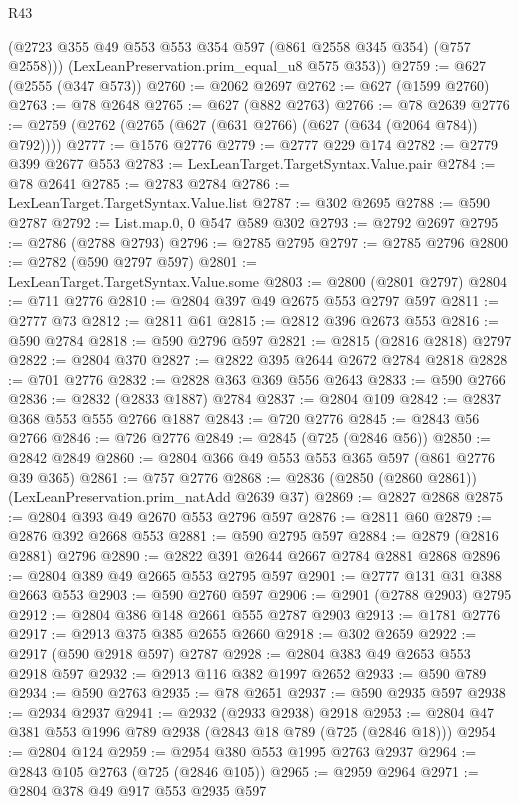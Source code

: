\begin{lexlean}{R43}
\begin{coremodule}
        (@2723 @355 @49 @553 @553 @354 @597 (@861 @2558 @345 @354) (@757 @2558)))
      (LexLeanPreservation.prim_equal_u8 @575 @353))
@2759 := @627 (@2555 (@347 @573))
@2760 := @2062 @2697
@2762 := @627 (@1599 @2760)
@2763 := @78 @2648
@2765 := @627 (@882 @2763)
@2766 := @78 @2639
@2776 := @2759 (@2762 (@2765 (@627 (@631 @2766) (@627 (@634 (@2064 @784)) @792))))
@2777 := @1576 @2776
@2779 := @2777 @229 @174
@2782 := @2779 @399 @2677 @553
@2783 := LexLeanTarget.TargetSyntax.Value.pair
@2784 := @78 @2641
@2785 := @2783 @2784
@2786 := LexLeanTarget.TargetSyntax.Value.list
@2787 := @302 @2695
@2788 := @590 @2787
@2792 := List.map.{0, 0} @547 @589 @302
@2793 := @2792 @2697
@2795 := @2786 (@2788 @2793)
@2796 := @2785 @2795
@2797 := @2785 @2796
@2800 := @2782 (@590 @2797 @597)
@2801 := LexLeanTarget.TargetSyntax.Value.some
@2803 := @2800 (@2801 @2797)
@2804 := @711 @2776
@2810 := @2804 @397 @49 @2675 @553 @2797 @597
@2811 := @2777 @73
@2812 := @2811 @61
@2815 := @2812 @396 @2673 @553
@2816 := @590 @2784
@2818 := @590 @2796 @597
@2821 := @2815 (@2816 @2818) @2797
@2822 := @2804 @370
@2827 := @2822 @395 @2644 @2672 @2784 @2818
@2828 := @701 @2776
@2832 := @2828 @363 @369 @556 @2643
@2833 := @590 @2766
@2836 := @2832 (@2833 @1887) @2784
@2837 := @2804 @109
@2842 := @2837 @368 @553 @555 @2766 @1887
@2843 := @720 @2776
@2845 := @2843 @56 @2766
@2846 := @726 @2776
@2849 := @2845 (@725 (@2846 @56))
@2850 := @2842 @2849
@2860 := @2804 @366 @49 @553 @553 @365 @597 (@861 @2776 @39 @365)
@2861 := @757 @2776
@2868 := @2836 (@2850 (@2860 @2861)) (LexLeanPreservation.prim_natAdd @2639 @37)
@2869 := @2827 @2868
@2875 := @2804 @393 @49 @2670 @553 @2796 @597
@2876 := @2811 @60
@2879 := @2876 @392 @2668 @553
@2881 := @590 @2795 @597
@2884 := @2879 (@2816 @2881) @2796
@2890 := @2822 @391 @2644 @2667 @2784 @2881 @2868
@2896 := @2804 @389 @49 @2665 @553 @2795 @597
@2901 := @2777 @131 @31 @388 @2663 @553
@2903 := @590 @2760 @597
@2906 := @2901 (@2788 @2903) @2795
@2912 := @2804 @386 @148 @2661 @555 @2787 @2903
@2913 := @1781 @2776
@2917 := @2913 @375 @385 @2655 @2660
@2918 := @302 @2659
@2922 := @2917 (@590 @2918 @597) @2787
@2928 := @2804 @383 @49 @2653 @553 @2918 @597
@2932 := @2913 @116 @382 @1997 @2652
@2933 := @590 @789
@2934 := @590 @2763
@2935 := @78 @2651
@2937 := @590 @2935 @597
@2938 := @2934 @2937
@2941 := @2932 (@2933 @2938) @2918
@2953 := @2804 @47 @381 @553 @1996 @789 @2938 (@2843 @18 @789 (@725 (@2846 @18)))
@2954 := @2804 @124
@2959 := @2954 @380 @553 @1995 @2763 @2937
@2964 := @2843 @105 @2763 (@725 (@2846 @105))
@2965 := @2959 @2964
@2971 := @2804 @378 @49 @917 @553 @2935 @597

\end{coremodule}
\end{lexlean}
